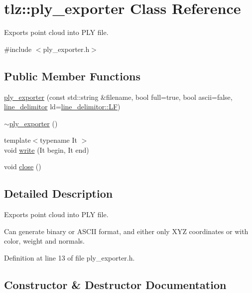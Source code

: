 \hypertarget{classtlz_1_1ply__exporter}{}\section{tlz\+:\+:ply\+\_\+exporter Class Reference}
\label{classtlz_1_1ply__exporter}


Exports point cloud into P\+LY file.  




{\ttfamily \#include $<$ply\+\_\+exporter.\+h$>$}

\subsection*{Public Member Functions}
\begin{DoxyCompactItemize}
\item 
\hyperlink{classtlz_1_1ply__exporter_af50ce371c128cab1c17209ef6172c542}{ply\+\_\+exporter} (const std\+::string \&filename, bool full=true, bool ascii=false, \hyperlink{namespacetlz_a9643974618d6e98138d9b009f5f6123d}{line\+\_\+delimitor} ld=\hyperlink{namespacetlz_a9643974618d6e98138d9b009f5f6123da618441d41cce47dbcfd9bed6e5ff64e6}{line\+\_\+delimitor\+::\+LF})
\item 
\hyperlink{classtlz_1_1ply__exporter_a04c96aa28c1731b78b37e9de3d30f29b}{$\sim$ply\+\_\+exporter} ()
\item 
{\footnotesize template$<$typename It $>$ }\\void \hyperlink{classtlz_1_1ply__exporter_abca05c1238efe13b3ab00bda8e4a23d2}{write} (It begin, It end)
\item 
void \hyperlink{classtlz_1_1ply__exporter_a50d9d05ee04c68020969f73ed1a7ccd3}{close} ()
\end{DoxyCompactItemize}


\subsection{Detailed Description}
Exports point cloud into P\+LY file. 

Can generate binary or A\+S\+C\+II format, and either only X\+YZ coordinates or with color, weight and normals. 

Definition at line 13 of file ply\+\_\+exporter.\+h.



\subsection{Constructor \& Destructor Documentation}
